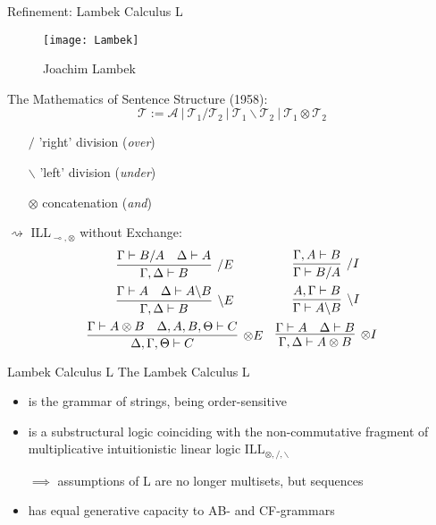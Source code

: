 \documentclass{beamer}
\newcommand{\li}{\!\multimap\!}
\begin{document}
\begin{frame}{Refinement: Lambek Calculus L}
	\small
	\begin{minipage}[t]{0.3\textwidth}
		\begin{figure}
		\texttt{[image: Lambek]}
		\caption{Joachim Lambek}
		\end{figure}	
	\end{minipage}%
	\begin{minipage}[t]{0.65\textwidth}
	\alert{The Mathematics of Sentence Structure (1958)}:
		\[
			\mathcal{T} := \mathcal{A} \ | \ \mathcal{T}_1/\mathcal{T}_2 \ | \ \mathcal{T}_1\backslash \mathcal{T}_2 \ | \ \mathcal{T}_1\otimes \mathcal{T}_2
		\]
		\vspace{-20pt}
		\begin{itemize}
			\item[$/$] 'right' division (\textit{over})
			\item[$\backslash$] 'left' division (\textit{under})
			\item[$\otimes$] concatenation (\textit{and})
		\end{itemize}
	\end{minipage}
	\vfill
	\pause
	
	$\rightsquigarrow$ \alert{ILL${}_{\li,\otimes}$ without Exchange}:
	\[
	\begin{array}{cc}
		\vcenter{\infer[/ E]{\Gamma, \Delta \vdash B}{\Gamma \vdash B/A & \Delta \vdash A}}
		&
		\vspace{5pt}
		\vcenter{\infer[/ I]{\Gamma \vdash B/A}{\Gamma, A \vdash B}} \\		\vcenter{\infer[\backslash E]{\Gamma, \Delta \vdash B}{\Gamma \vdash A & \Delta \vdash A\backslash B}}
		\vspace{5pt}
		&
		\vcenter{\infer[\backslash I]{\Gamma \vdash A\backslash B}{A, \Gamma \vdash B}} \\
		\vcenter{\infer[\otimes E]{\Delta, \Gamma, \Theta \vdash C}{
			\Gamma \vdash A\otimes B
			&
			\Delta, A, B, \Theta \vdash C
		}}
		&
		\vcenter{\infer[\otimes I]{\Gamma, \Delta \vdash A\otimes B}{
			\Gamma \vdash A 
			&
			\Delta \vdash B
			}} \\
	\end{array}
	\]
\end{frame}

\begin{frame}{Lambek Calculus L}
	\small
	\alert{The Lambek Calculus L}\\
	\begin{itemize}
	\item is the grammar of \alert{strings}, being order-sensitive
	\item is a substructural logic coinciding with the non-commutative fragment of multiplicative intuitionistic linear logic $\text{ILL}_{\otimes, /, \backslash}$
	\item[] $\implies$ assumptions of L are no longer multisets, but \alert{sequences}
	\item has equal generative capacity to AB- and CF-grammars
	\end{itemize}

\end{frame}
\end{document}
